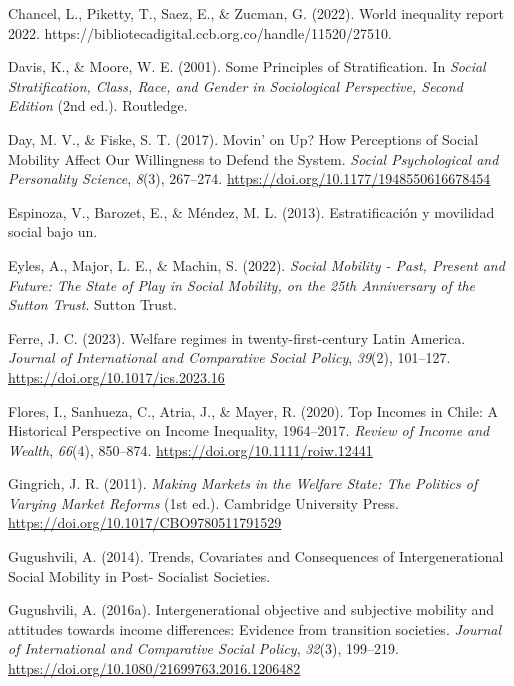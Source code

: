 \documentclass[
  13pt,
]{article}
\newlength{\cslhangindent}
\newenvironment{CSLReferences}[2] %
 {\begin{list}{}{%
  \setlength{\itemindent}{0pt}
  \setlength{\leftmargin}{0pt}
  \setlength{\parsep}{0pt}
  \ifodd #1
   \setlength{\leftmargin}{\cslhangindent}
   \setlength{\itemindent}{-1\cslhangindent}
  \fi
  \setlength{\itemsep}{#2\baselineskip}}}
 {\end{list}}
\begin{document}
\begin{CSLReferences}{1}{0}
Chancel, L., Piketty, T., Saez, E., \& Zucman, G. (2022). World
inequality report 2022.
https://bibliotecadigital.ccb.org.co/handle/11520/27510.

Davis, K., \& Moore, W. E. (2001). Some {Principles} of
{Stratification}. In \emph{Social {Stratification}, {Class}, {Race}, and
{Gender} in {Sociological Perspective}, {Second Edition}} (2nd ed.).
Routledge.

Day, M. V., \& Fiske, S. T. (2017). Movin' on {Up}? {How Perceptions} of
{Social Mobility Affect Our Willingness} to {Defend} the {System}.
\emph{Social Psychological and Personality Science}, \emph{8}(3),
267--274. \url{https://doi.org/10.1177/1948550616678454}

Espinoza, V., Barozet, E., \& Méndez, M. L. (2013). {Estratificaci{ó}n y
movilidad social bajo un}.

Eyles, A., Major, L. E., \& Machin, S. (2022). \emph{Social {Mobility} -
{Past}, {Present} and {Future}: {The State} of {Play} in {Social
Mobility}, on the 25th {Anniversary} of the {Sutton Trust}}. Sutton
Trust.

Ferre, J. C. (2023). Welfare regimes in twenty-first-century {Latin
America}. \emph{Journal of International and Comparative Social Policy},
\emph{39}(2), 101--127. \url{https://doi.org/10.1017/ics.2023.16}

Flores, I., Sanhueza, C., Atria, J., \& Mayer, R. (2020). Top {Incomes}
in {Chile}: {A Historical Perspective} on {Income Inequality},
1964--2017. \emph{Review of Income and Wealth}, \emph{66}(4), 850--874.
\url{https://doi.org/10.1111/roiw.12441}

Gingrich, J. R. (2011). \emph{Making {Markets} in the {Welfare State}:
{The Politics} of {Varying Market Reforms}} (1st ed.). Cambridge
University Press. \url{https://doi.org/10.1017/CBO9780511791529}

Gugushvili, A. (2014). Trends, {Covariates} and {Consequences} of
{Intergenerational Social Mobility} in {Post- Socialist Societies}.

Gugushvili, A. (2016a). Intergenerational objective and subjective
mobility and attitudes towards income differences: Evidence from
transition societies. \emph{Journal of International and Comparative
Social Policy}, \emph{32}(3), 199--219.
\url{https://doi.org/10.1080/21699763.2016.1206482}


\end{CSLReferences}
\end{document}
